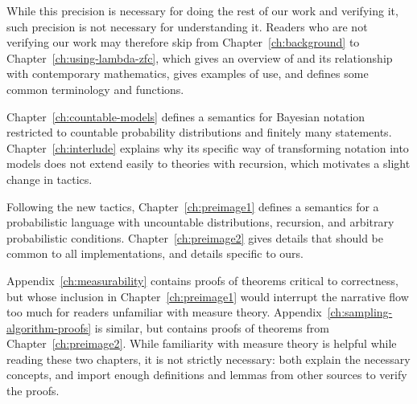 While this precision is necessary for doing the rest of our work and verifying it, such precision is not necessary for understanding it.
Readers who are not verifying our work may therefore skip from Chapter~\ref{ch:background} to Chapter~\ref{ch:using-lambda-zfc}, which gives an overview of \lzfclang and its relationship with contemporary mathematics, gives examples of use, and defines some common terminology and functions.

Chapter~\ref{ch:countable-models} defines a semantics for Bayesian notation restricted to countable probability distributions and finitely many statements.
Chapter~\ref{ch:interlude} explains why its specific way of transforming notation into models does not extend easily to theories with recursion, which motivates a slight change in tactics.

Following the new tactics, Chapter~\ref{ch:preimage1} defines a semantics for a probabilistic language with uncountable distributions, recursion, and arbitrary probabilistic conditions.
Chapter~\ref{ch:preimage2} gives details that should be common to all implementations, and details specific to ours.

Appendix~\ref{ch:measurability} contains proofs of theorems critical to correctness, but whose inclusion in Chapter~\ref{ch:preimage1} would interrupt the narrative flow too much for readers unfamiliar with measure theory.
Appendix~\ref{ch:sampling-algorithm-proofs} is similar, but contains proofs of theorems from Chapter~\ref{ch:preimage2}.
While familiarity with measure theory is helpful while reading these two chapters, it is not strictly necessary: both explain the necessary concepts, and import enough definitions and lemmas from other sources to verify the proofs.

